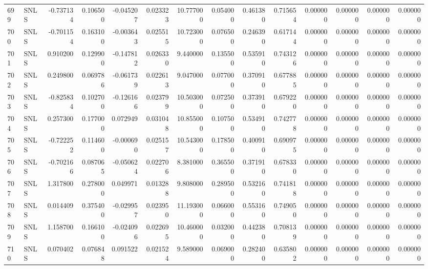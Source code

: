 \begin{tabular}{llrrrrrrrrrrrr}
699 &   SNLS & -0.737134 &      0.106500 & -0.045207 &    0.023323 &  10.777000 &      0.054000 &   0.461380 &  0.715654 &  0.000000 &   0.000000 &     0.000000 &     0.000000 \\
700 &   SNLS & -0.701154 &      0.163100 & -0.003643 &    0.025515 &  10.723000 &      0.076500 &   0.246390 &  0.617144 &  0.000000 &   0.000000 &     0.000000 &     0.000000 \\
701 &   SNLS &  0.910200 &      0.129900 & -0.147812 &    0.026330 &   9.440000 &      0.135500 &   0.535910 &  0.743126 &  0.000000 &   0.000000 &     0.000000 &     0.000000 \\
702 &   SNLS &  0.249800 &      0.069786 & -0.061739 &    0.022613 &   9.047000 &      0.077000 &   0.370910 &  0.677885 &  0.000000 &   0.000000 &     0.000000 &     0.000000 \\
703 &   SNLS & -0.825834 &      0.102700 & -0.126166 &    0.023799 &  10.503000 &      0.072500 &   0.373910 &  0.679220 &  0.000000 &   0.000000 &     0.000000 &     0.000000 \\
704 &   SNLS &  0.257300 &      0.177000 &  0.072949 &    0.031048 &  10.855000 &      0.107500 &   0.534910 &  0.742778 &  0.000000 &   0.000000 &     0.000000 &     0.000000 \\
705 &   SNLS & -0.722252 &      0.114600 & -0.000690 &    0.025157 &  10.543000 &      0.178500 &   0.400910 &  0.690975 &  0.000000 &   0.000000 &     0.000000 &     0.000000 \\
706 &   SNLS & -0.702166 &      0.087065 & -0.050624 &    0.022706 &   8.381000 &      0.365500 &   0.371910 &  0.678330 &  0.000000 &   0.000000 &     0.000000 &     0.000000 \\
707 &   SNLS &  1.317800 &      0.278000 &  0.049971 &    0.013288 &   9.808000 &      0.289500 &   0.532160 &  0.741818 &  0.000000 &   0.000000 &     0.000000 &     0.000000 \\
708 &   SNLS &  0.014409 &      0.375400 & -0.029957 &    0.023950 &  11.193000 &      0.066000 &   0.553160 &  0.749050 &  0.000000 &   0.000000 &     0.000000 &     0.000000 \\
709 &   SNLS &  1.158700 &      0.166100 & -0.024096 &    0.022695 &  10.460000 &      0.032000 &   0.442380 &  0.708139 &  0.000000 &   0.000000 &     0.000000 &     0.000000 \\
710 &   SNLS &  0.070402 &      0.076848 &  0.091522 &    0.021524 &   9.589000 &      0.069000 &   0.282400 &  0.635802 &  0.000000 &   0.000000 &     0.000000 &     0.000000 \\

\end{tabular}

